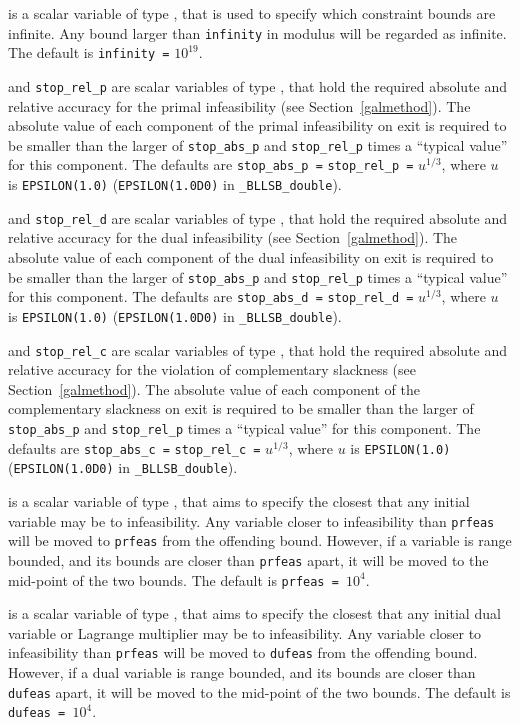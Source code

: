 \documentclass{galahad}
\newcommand{\packagename}{BLLSB}
\newcommand{\fullpackagename}{\libraryname\_\packagename}
\begin{document}
\begin{description}
 is a scalar variable of type \realdp, that is used to
specify which constraint bounds are infinite.
Any bound larger than {\tt infinity} in modulus will be regarded as infinite.
The default is {\tt infinity =} $10^{19}$.

 and {\tt stop\_rel\_p}
are scalar variables of type \realdp, that hold the
required absolute and relative accuracy for the primal infeasibility
(see Section~\ref{galmethod}).
The absolute value of each component of the primal infeasibility
on exit is required to be smaller than the larger of {\tt stop\_abs\_p} and
{\tt stop\_rel\_p} times a ``typical value'' for this component.
The defaults are {\tt stop\_abs\_p =} {\tt stop\_rel\_p =} $u^{1/3}$,
where $u$ is {\tt EPSILON(1.0)} ({\tt EPSILON(1.0D0)} in
{\tt \fullpackagename\_double}).

 and {\tt stop\_rel\_d}
are scalar variables of type \realdp, that hold the
required absolute and relative accuracy for the dual infeasibility
(see Section~\ref{galmethod}).
The absolute value of each component of the dual infeasibility
on exit is required to be smaller than the larger of {\tt stop\_abs\_p} and
{\tt stop\_rel\_p} times a ``typical value'' for this component.
The defaults are {\tt stop\_abs\_d =} {\tt stop\_rel\_d =} $u^{1/3}$,
where $u$ is {\tt EPSILON(1.0)} ({\tt EPSILON(1.0D0)} in
{\tt \fullpackagename\_double}).

 and {\tt stop\_rel\_c}
are scalar variables of type \realdp, that hold the
required absolute and relative accuracy
for the violation of complementary slackness
(see Section~\ref{galmethod}).
The absolute value of each component of the complementary slackness
on exit is required to be smaller than the larger of {\tt stop\_abs\_p} and
{\tt stop\_rel\_p} times a ``typical value'' for this component.
The defaults are {\tt stop\_abs\_c =} {\tt stop\_rel\_c =} $u^{1/3}$,
where $u$ is {\tt EPSILON(1.0)} ({\tt EPSILON(1.0D0)} in
{\tt \fullpackagename\_double}).

 is a scalar variable of type \realdp, that aims to specify
the closest that any initial variable may be to infeasibility. Any variable
closer to infeasibility than {\tt prfeas} will be moved to {\tt prfeas} from
the offending bound. However, if a variable is range bounded, and its bounds
are closer than {\tt prfeas} apart, it will be moved to the mid-point of the
two bounds.
The default is {\tt prfeas = $10^4$}.

 is a scalar variable of type \realdp, that aims to specify
the closest that any initial dual variable or Lagrange multiplier may be to
infeasibility. Any variable closer to infeasibility than {\tt prfeas} will be
moved to {\tt dufeas} from the offending bound. However, if a dual variable
is range bounded, and its bounds are closer than {\tt dufeas} apart, it will
be moved to the mid-point of the two bounds.
The default is {\tt dufeas = $10^4$}.


\end{description}
\end{document}
